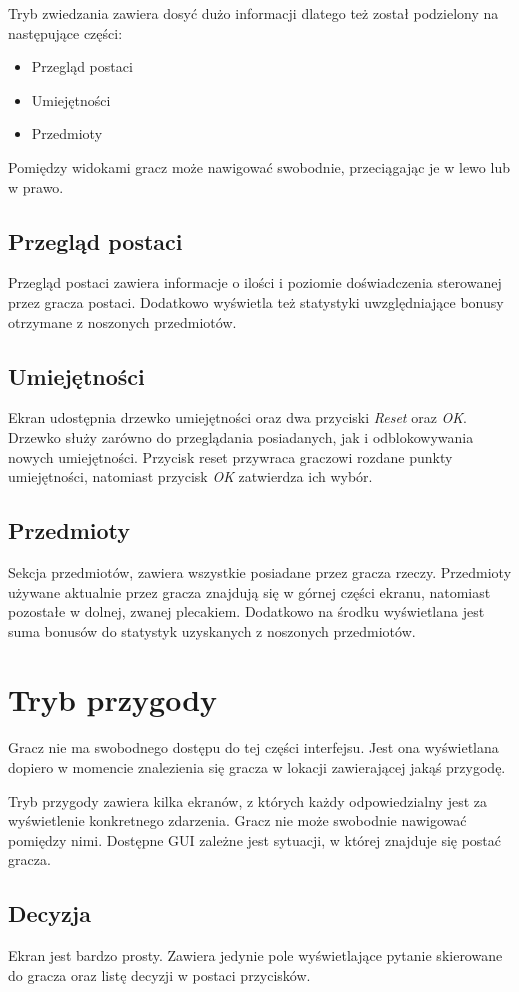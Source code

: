\documentclass[openright]{xmgr}
\begin{document}
Tryb zwiedzania zawiera dosyć dużo informacji dlatego też został podzielony na następujące części: 
\begin{itemize}
	\item Przegląd postaci
	\item Umiejętności
	\item Przedmioty
\end{itemize}
Pomiędzy widokami gracz może nawigować swobodnie, przeciągając je w lewo lub w prawo.
\subsection*{Przegląd postaci}
Przegląd postaci zawiera informacje o ilości i poziomie doświadczenia sterowanej przez gracza postaci. Dodatkowo wyświetla też statystyki uwzględniające bonusy otrzymane z noszonych przedmiotów.
\subsection*{Umiejętności}
Ekran udostępnia drzewko umiejętności oraz dwa przyciski \textit{Reset} oraz \textit{OK}. Drzewko służy zarówno do przeglądania posiadanych, jak i odblokowywania nowych umiejętności. Przycisk reset przywraca graczowi rozdane punkty umiejętności, natomiast przycisk \textit{OK} zatwierdza ich wybór.
\subsection*{Przedmioty}
Sekcja przedmiotów, zawiera wszystkie posiadane przez gracza rzeczy. Przedmioty używane aktualnie przez gracza znajdują się w górnej części ekranu, natomiast pozostałe w dolnej, zwanej plecakiem. Dodatkowo na środku wyświetlana jest suma bonusów do statystyk uzyskanych z noszonych przedmiotów.
\section{Tryb przygody}
Gracz nie ma swobodnego dostępu do tej części interfejsu. Jest ona wyświetlana dopiero w momencie znalezienia się gracza w lokacji zawierającej jakąś przygodę.

Tryb przygody zawiera kilka ekranów, z których każdy odpowiedzialny jest za wyświetlenie konkretnego zdarzenia. Gracz nie może swobodnie nawigować pomiędzy nimi. Dostępne GUI zależne jest sytuacji, w której znajduje się postać gracza.
\subsection*{Decyzja}
Ekran jest bardzo prosty. Zawiera jedynie pole wyświetlające pytanie skierowane do gracza oraz listę decyzji w postaci przycisków.
\end{document}

